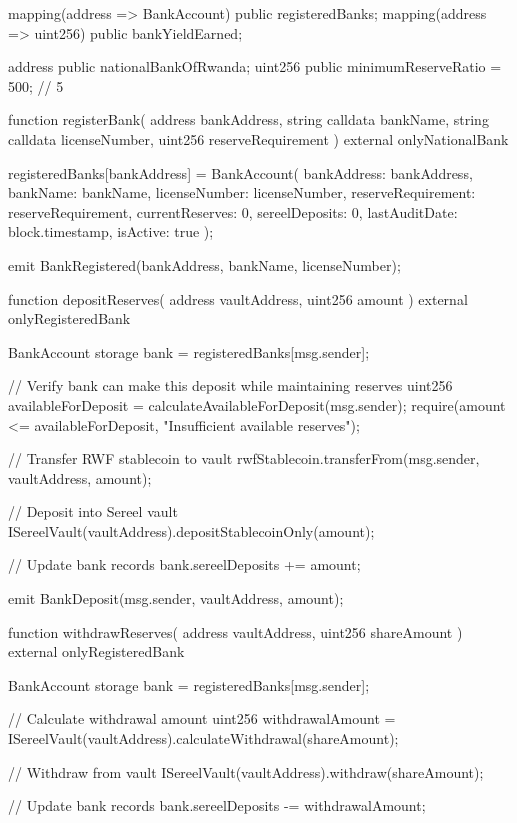 \documentclass[12pt]{article}
\begin{document}
{{    mapping(address => BankAccount) public registeredBanks;    mapping(address => uint256) public bankYieldEarned;

    address public nationalBankOfRwanda;    uint256 public minimumReserveRatio = 500; // 5%

    function registerBank(        address bankAddress,        string calldata bankName,        string calldata licenseNumber,        uint256 reserveRequirement    ) external onlyNationalBank {        registeredBanks[bankAddress] = BankAccount({            bankAddress: bankAddress,            bankName: bankName,            licenseNumber: licenseNumber,            reserveRequirement: reserveRequirement,            currentReserves: 0,            sereelDeposits: 0,            lastAuditDate: block.timestamp,            isActive: true        });

        emit BankRegistered(bankAddress, bankName, licenseNumber);    }

    function depositReserves(        address vaultAddress,        uint256 amount    ) external onlyRegisteredBank {        BankAccount storage bank = registeredBanks[msg.sender];

        // Verify bank can make this deposit while maintaining reserves        uint256 availableForDeposit = calculateAvailableForDeposit(msg.sender);        require(amount <= availableForDeposit, "Insufficient available reserves");

        // Transfer RWF stablecoin to vault        rwfStablecoin.transferFrom(msg.sender, vaultAddress, amount);

        // Deposit into Sereel vault        ISereelVault(vaultAddress).depositStablecoinOnly(amount);

        // Update bank records        bank.sereelDeposits += amount;

        emit BankDeposit(msg.sender, vaultAddress, amount);    }

    function withdrawReserves(        address vaultAddress,        uint256 shareAmount    ) external onlyRegisteredBank {        BankAccount storage bank = registeredBanks[msg.sender];

        // Calculate withdrawal amount        uint256 withdrawalAmount = ISereelVault(vaultAddress).calculateWithdrawal(shareAmount);

        // Withdraw from vault        ISereelVault(vaultAddress).withdraw(shareAmount);

        // Update bank records        bank.sereelDeposits -= withdrawalAmount;

}}}
\end{document}
